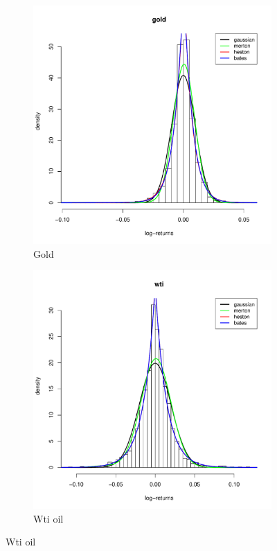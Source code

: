 \begin{figure}
	\begin{subfigure}{0.44\textwidth}
		\centering
		\includegraphics[width=\linewidth]{Images/hist_gold.pdf}
		\caption{Gold}
	\end{subfigure}
	\begin{subfigure}{0.44\textwidth}
		\centering
		\includegraphics[width=\linewidth]{Images/hist_wti.pdf}
		\caption{Wti oil}
	\end{subfigure}
	

\end{figure}
